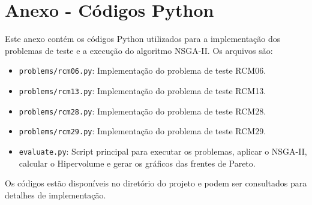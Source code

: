 \documentclass[12pt,openright,oneside,a4paper,english,brazil]{abntex2}
\begin{document}
\chapter{Anexo - Códigos Python}

Este anexo contém os códigos Python utilizados para a implementação dos problemas de teste e a execução do algoritmo NSGA-II. Os arquivos são:

\begin{itemize}
    \item \texttt{problems/rcm06.py}: Implementação do problema de teste RCM06.
    \item \texttt{problems/rcm13.py}: Implementação do problema de teste RCM13.
    \item \texttt{problems/rcm28.py}: Implementação do problema de teste RCM28.
    \item \texttt{problems/rcm29.py}: Implementação do problema de teste RCM29.
    \item \texttt{evaluate.py}: Script principal para executar os problemas, aplicar o NSGA-II, calcular o Hipervolume e gerar os gráficos das frentes de Pareto.
\end{itemize}

Os códigos estão disponíveis no diretório do projeto e podem ser consultados para detalhes de implementação.
\end{document}
